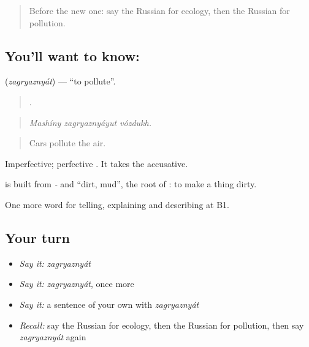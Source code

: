 \label{lesson:RU-C369-zagryaznyat}



\begin{quote}
Before the new one: say the Russian for ecology, then the Russian for pollution.
\end{quote}

\subsection*{You'll want to know: }
\textbf{} (\emph{zagryaznyát}) — \textquotedblleft{}to pollute\textquotedblright{}.

\begin{quote}
  .
\end{quote}

\begin{quote}
\emph{Mashíny zagryaznyáyut vózdukh.}
\end{quote}

\begin{quote}
Cars pollute the air.
\end{quote}

Imperfective; perfective \emph{}. It takes the accusative.

\begin{cousinweb}
\textbf{} is built from \emph{-} and \emph{} \textquotedblleft{}dirt, mud\textquotedblright{}, the root of \emph{}: to make a thing dirty.
\end{cousinweb}

\begin{grammarlens}[title={What you've built}]
One more word for telling, explaining and describing at B1.
\end{grammarlens}

\subsection*{Your turn}
\begin{itemize}
\raggedright
  \item \emph{Say it:} \emph{zagryaznyát}
  \item \emph{Say it:} \emph{zagryaznyát}, once more
  \item \emph{Say it:} a sentence of your own with \emph{zagryaznyát}
  \item \emph{Recall:} say the Russian for ecology, then the Russian for pollution, then say \emph{zagryaznyát} again
\end{itemize}

